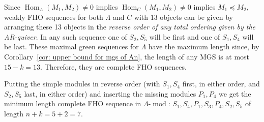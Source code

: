 \documentclass[ALCO,ThmDefs,Unicode,epreuves]{cedram}
\DeclareMathOperator{\Hom}{Hom}%
\DeclareMathOperator{\modr}{mod}
\begin{document}
\begin{exam}
Since $\Hom_\Lambda(M_1,M_2)\neq 0$ implies $\Hom_C(M_1,M_2)\neq 0$ implies $M_1\preceq M_2$, weakly FHO sequences for both $\Lambda$ and $C$ with $13$ objects can be given by arranging these 13 objects in the \emph{reverse order of any total ordering given by the AR-quiver}. In any such sequence one of $S_2,S_5$ will be first and one of $S_1,S_4$ will be last. These maximal green sequences for $\Lambda$ have the maximum length since, by Corollary~\ref{cor: upper bound for mgs of An}, the length of any MGS is at most $15-k=13$. Therefore, they are complete FHO sequences.

Putting the simple modules in reverse order (with $S_1,S_4$ first, in either order, and $S_2,S_5$ last, in either order) and inserting the missing modules $P_1,P_4$ we get the minimum length complete FHO sequence in $\Lambda\text{-}\modr $: $S_1,S_4,P_1,S_3,P_4,S_2,S_5$ of length $n+k=5+2=7$.
\end{exam}
\end{document}
